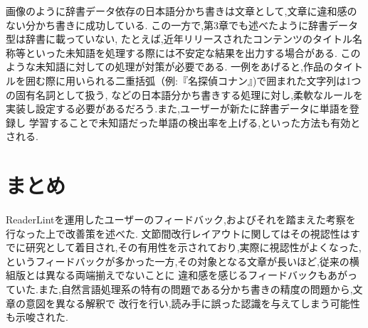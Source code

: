 
画像のように辞書データ依存の日本語分かち書きは文章として,文章に違和感のない分かち書きに成功している.
この一方で,第3章でも述べたように辞書データ型は辞書に載っていない,
たとえば,近年リリースされたコンテンツのタイトル名称等といった未知語を処理する際には不安定な結果を出力する場合がある.
このような未知語に対しての処理が対策が必要である.
一例をあげると,作品のタイトルを囲む際に用いられる二重括弧（例:『名探偵コナン』)で囲まれた文字列は1つの固有名詞として扱う,
などの日本語分かち書きする処理に対し,柔軟なルールを実装し設定する必要があるだろう.また,ユーザーが新たに辞書データに単語を登録し
学習することで未知語だった単語の検出率を上げる,といった方法も有効とされる.

\section{まとめ}
ReaderLintを運用したユーザーのフィードバック,およびそれを踏まえた考察を行なった上で改善策を述べた.
文節間改行レイアウトに関してはその視認性はすでに研究として着目され,その有用性を示されており,実際に視認性がよくなった,
というフィードバックが多かった一方,その対象となる文章が長いほど,従来の横組版とは異なる両端揃えでないことに
違和感を感じるフィードバックもあがっていた.また,自然言語処理系の特有の問題である分かち書きの精度の問題から,文章の意図を異なる解釈で
改行を行い,読み手に誤った認識を与えてしまう可能性も示唆された.